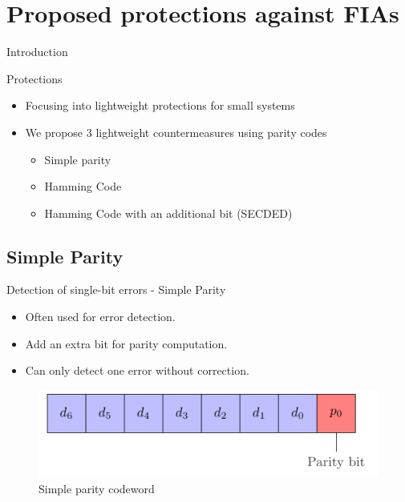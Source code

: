\section{Proposed protections against FIAs}


\begin{frame}{Introduction}
    \begin{block}{Protections}
        \begin{itemize}
            \item Focusing into lightweight protections for small systems
            \item We propose 3 lightweight countermeasures using parity codes
            \begin{itemize}
                \item Simple parity
                \item Hamming Code
                \item Hamming Code with an additional bit (SECDED)
            \end{itemize}
        \end{itemize}
    \end{block}
\end{frame}
\subsection{Simple Parity}
    \begin{frame}{Detection of single-bit errors - Simple Parity}
        \begin{block}{}
            \begin{itemize}
                \justifying
                \item Often used for error detection.
                \item Add an extra bit for parity computation.
                \item Can only detect one error without correction.
            \end{itemize}
        \end{block}

        \vfill
        
        \begin{figure}
            \centering
            \includegraphics[width=.5\textwidth, page=1]{src/4_strategies/img/simple_parity.pdf}
            \caption{Simple parity codeword}
            \label{fig:simple_parity_codeword}
        \end{figure}
    \end{frame}

